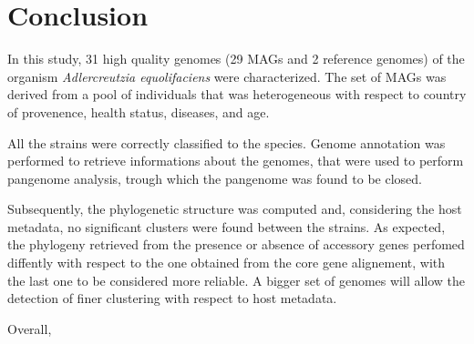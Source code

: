 \clearpage
\section*{Conclusion}

In this study, 31 high quality genomes (29 MAGs and 2 reference genomes)
of the organism \emph{Adlercreutzia equolifaciens} were characterized.
The set of MAGs was derived from a pool of individuals that was heterogeneous
with respect to country of provenence, health status, diseases, and age. 

All the strains were correctly classified to the species. 
Genome annotation was performed to retrieve informations about the genomes, that 
were used to perform pangenome analysis, trough which the pangenome was found to be closed.

Subsequently, the phylogenetic structure was computed and, considering the host metadata,
no significant clusters were found between the strains. As expected, the phylogeny 
retrieved from the presence or absence of accessory genes perfomed diffently with respect
to the one obtained from the core gene alignement, with the last one to be considered
more reliable. A bigger set of genomes will allow the detection of finer clustering with respect
to host metadata.

Overall, 







